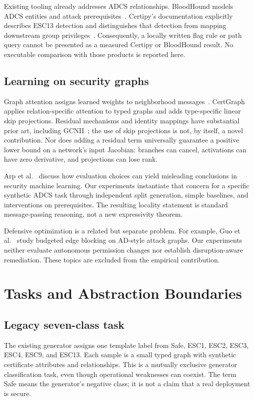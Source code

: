 \documentclass[journal]{IEEEtran}
\begin{document}
Existing tooling already addresses ADCS relationships. BloodHound models ADCS entities and attack prerequisites~\cite{bhadcs}. Certipy's documentation explicitly describes ESC13 detection and distinguishes that detection from mapping downstream group privileges~\cite{certipy}. Consequently, a locally written flag rule or path query cannot be presented as a measured Certipy or BloodHound result. No executable comparison with those products is reported here.

\subsection{Learning on security graphs}
Graph attention assigns learned weights to neighborhood messages~\cite{gat}. CertGraph applies relation-specific attention to typed graphs and adds type-specific linear skip projections. Residual mechanisms and identity mappings have substantial prior art, including GCNII~\cite{gcnii}; the use of skip projections is not, by itself, a novel contribution. Nor does adding a residual term universally guarantee a positive lower bound on a network's input Jacobian: branches can cancel, activations can have zero derivative, and projections can lose rank.

Arp et al.~\cite{arp} discuss how evaluation choices can yield misleading conclusions in security machine learning. Our experiments instantiate that concern for a specific synthetic ADCS task through independent split generation, simple baselines, and interventions on prerequisites. The resulting locality statement is standard message-passing reasoning, not a new expressivity theorem.

Defensive optimization is a related but separate problem. For example, Guo et al.~\cite{guo} study budgeted edge blocking on AD-style attack graphs. Our experiments neither evaluate autonomous permission changes nor establish disruption-aware remediation. These topics are excluded from the empirical contribution.

\section{Tasks and Abstraction Boundaries}
\subsection{Legacy seven-class task}
The existing generator assigns one template label from Safe, ESC1, ESC2, ESC3, ESC4, ESC9, and ESC13. Each sample is a small typed graph with synthetic certificate attributes and relationships. This is a mutually exclusive generator classification task, even though operational weaknesses can coexist. The term Safe means the generator's negative class; it is not a claim that a real deployment is secure.
\end{document}
